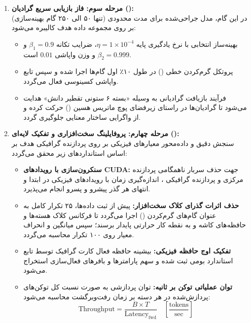 \documentclass[12pt,a4paper]{report}
\theoremstyle{definition}
\begin{document}
\begin{enumerate}
    \item \textbf{مرحله سوم: فاز بازیابی سریع گرادیان ():} \\
    در این گام، مدل جراحی‌شده برای مدت محدودی (تنها ۵۰ الی ۲۵۰ گام بهینه‌سازی) بر روی مجموعه داده هدف کالیبره می‌شود:
    \begin{itemize}
        \item بهینه‌ساز انتخابی  با نرخ یادگیری پایه $\eta = 1 \times 10^{-4}$، ضرایب تکانه $\beta_1=0.9$ و $\beta_2=0.999$ و وزن واپاشی $0.01$ است.
        \item پروتکل گرم‌کردن خطی () در طول ۱۰٪ اول گام‌ها اجرا شده و سپس تابع واپاشی کسینوسی فعال می‌گردد.
        \item فرآیند بازیافت گرادیانی به وسیله «بسته ۶ ستونی تقطیر دانش» هدایت می‌شود تا گرادیان‌ها در راستای زیرفضای پوچ ماتریس هسین () \cite{huang2026hnc} حرکت کرده و از واگرایی ساختار معنایی جلوگیری گردد.
    \end{itemize}

    \item \textbf{مرحله چهارم: پروفایلینگ سخت‌افزاری و تفکیک لایه‌ای ():} \\
    سنجش دقیق و داده‌محور معیارهای فیزیکی بر روی پردازنده گرافیکی هدف بر اساس استانداردهای زیر محقق می‌گردد:
    \begin{itemize}
        \item \textbf{سنکرون‌سازی با رویدادهای CUDA:} جهت حذف سربار ناهمگامی پردازنده مرکزی  و پردازنده گرافیکی ، اندازه‌گیری زمان با رویدادهای فیزیکی  در ابتدا و انتهای هر گذر پیشرو و پسرو انجام می‌پذیرد.
        \item \textbf{حذف اثرات گذرای کلاک سخت‌افزار:} پیش از ثبت داده‌ها، ۲۵ تکرار کامل به عنوان گام‌های گرم‌کردن () اجرا می‌گردد تا فرکانس کلاک هسته‌ها و حافظه‌های کاشه  و  به نقطه کار حرارتی پایدار برسند؛ سپس میانگین و انحراف معیار روی ۱۰۰ تکرار محاسبه می‌گردد.
        \item \textbf{تفکیک اوج حافظه فیزیکی:} بیشینه حافظه فعال کارت گرافیک توسط تابع استاندارد بومی  ثبت شده و سهم پارامترها و بافرهای فعال‌سازی استخراج می‌شود.
        \item \textbf{توان عملیاتی توکن بر ثانیه:} توان پردازشی به صورت نسبت کل توکن‌های پردازش‌شده در هر دسته بر زمان رفت‌وبرگشت محاسبه می‌شود:
        \begin{equation}
            \text{Throughput} = \frac{B \times T}{\text{Latency}_{\text{fwd}}} \quad \left[\frac{\text{tokens}}{\text{sec}}\right]
        \end{equation}
    \end{itemize}
\end{enumerate}
\end{document}
